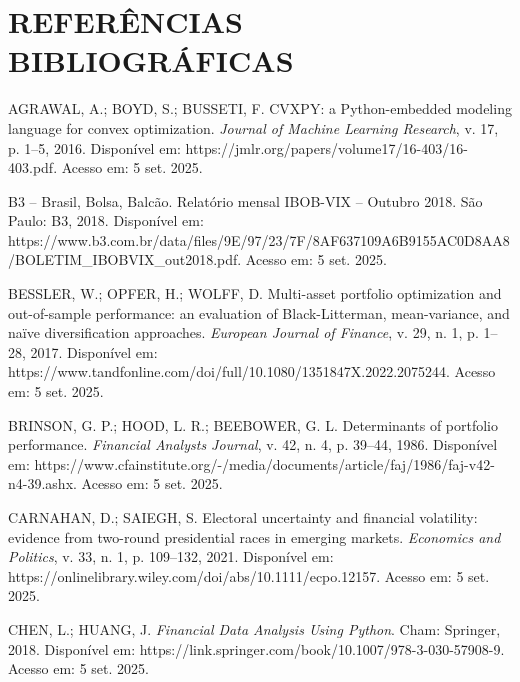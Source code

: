 
\chapter*{REFERÊNCIAS BIBLIOGRÁFICAS}


\begin{thebibliography}{99}

AGRAWAL, A.; BOYD, S.; BUSSETI, F. CVXPY: a Python-embedded modeling language for convex optimization. \textit{Journal of Machine Learning Research}, v. 17, p. 1--5, 2016. Disponível em: https://jmlr.org/papers/volume17/16-403/16-403.pdf. Acesso em: 5 set. 2025.

B3 -- Brasil, Bolsa, Balcão. Relatório mensal IBOB-VIX -- Outubro 2018. São Paulo: B3, 2018. Disponível em: https://www.b3.com.br/data/files/9E/97/23/7F/8AF637109A6B9155AC0D8AA8/BOLETIM\_IBOBVIX\_out2018.pdf. Acesso em: 5 set. 2025.

BESSLER, W.; OPFER, H.; WOLFF, D. Multi-asset portfolio optimization and out-of-sample performance: an evaluation of Black-Litterman, mean-variance, and naïve diversification approaches. \textit{European Journal of Finance}, v. 29, n. 1, p. 1--28, 2017. Disponível em: https://www.tandfonline.com/doi/full/10.1080/1351847X.2022.2075244. Acesso em: 5 set. 2025.

BRINSON, G. P.; HOOD, L. R.; BEEBOWER, G. L. Determinants of portfolio performance. \textit{Financial Analysts Journal}, v. 42, n. 4, p. 39--44, 1986. Disponível em: https://www.cfainstitute.org/-/media/documents/article/faj/1986/faj-v42-n4-39.ashx. Acesso em: 5 set. 2025.

CARNAHAN, D.; SAIEGH, S. Electoral uncertainty and financial volatility: evidence from two-round presidential races in emerging markets. \textit{Economics and Politics}, v. 33, n. 1, p. 109--132, 2021. Disponível em: https://onlinelibrary.wiley.com/doi/abs/10.1111/ecpo.12157. Acesso em: 5 set. 2025.

CHEN, L.; HUANG, J. \textit{Financial Data Analysis Using Python}. Cham: Springer, 2018. Disponível em: https://link.springer.com/book/10.1007/978-3-030-57908-9. Acesso em: 5 set. 2025.


\end{thebibliography}
